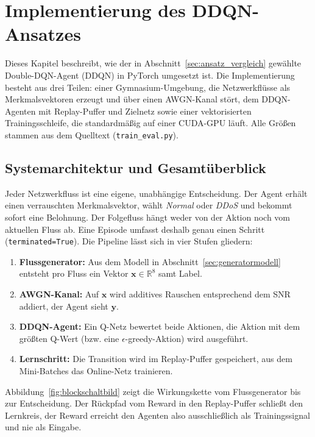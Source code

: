 \chapter{Implementierung des DDQN-Ansatzes}
\label{chap:implementierung}

Dieses Kapitel beschreibt, wie der in Abschnitt~\ref{sec:ansatz_vergleich} gewählte Double-DQN-Agent (DDQN) in PyTorch umgesetzt ist. Die Implementierung besteht aus drei Teilen: einer Gymnasium-Umgebung, die Netzwerkflüsse als Merkmalsvektoren erzeugt und über einen AWGN-Kanal stört, dem DDQN-Agenten mit Replay-Puffer und Zielnetz sowie einer vektorisierten Trainingsschleife, die standardmäßig auf einer CUDA-GPU läuft. Alle Größen stammen aus dem Quelltext (\texttt{train\_eval.py}).

\section{Systemarchitektur und Gesamtüberblick}
\label{sec:systemarchitektur}

Jeder Netzwerkfluss ist eine eigene, unabhängige Entscheidung. Der Agent erhält einen verrauschten Merkmalsvektor, wählt \emph{Normal} oder \emph{DDoS} und bekommt sofort eine Belohnung. Der Folgefluss hängt weder von der Aktion noch vom aktuellen Fluss ab. Eine Episode umfasst deshalb genau einen Schritt (\texttt{terminated=True}). Die Pipeline lässt sich in vier Stufen gliedern:

\begin{enumerate}
	\item \textbf{Flussgenerator:} Aus dem Modell in Abschnitt~\ref{sec:generatormodell} entsteht pro Fluss ein Vektor $\mathbf{x}\in\mathbb{R}^8$ samt Label.
	\item \textbf{AWGN-Kanal:} Auf $\mathbf{x}$ wird additives Rauschen entsprechend dem SNR addiert, der Agent sieht $\mathbf{y}$.
	\item \textbf{DDQN-Agent:} Ein Q-Netz bewertet beide Aktionen, die Aktion mit dem größten Q-Wert (bzw. eine $\epsilon$-greedy-Aktion) wird ausgeführt.
	\item \textbf{Lernschritt:} Die Transition wird im Replay-Puffer gespeichert, aus dem Mini-Batches das Online-Netz trainieren.
\end{enumerate}

Abbildung~\ref{fig:blockschaltbild} zeigt die Wirkungskette vom Flussgenerator bis zur Entscheidung. Der Rückpfad vom Reward in den Replay-Puffer schließt den Lernkreis, der Reward erreicht den Agenten also ausschließlich als Trainingssignal und nie als Eingabe.

